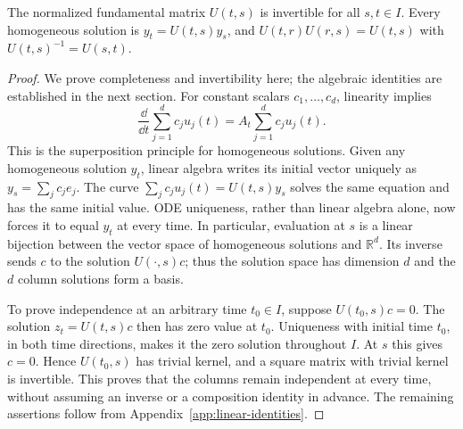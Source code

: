 \documentclass[12pt,a4paper,oneside]{book}
\begin{document}
\begin{theorem}
\label{thm:affine-flow}
The normalized fundamental matrix $U(t,s)$ is invertible for all
$s,t\in I$. Every homogeneous solution is $y_t=U(t,s)y_s$, and
$U(t,r)U(r,s)=U(t,s)$ with $U(t,s)^{-1}=U(s,t)$.
\end{theorem}
\begin{proof}
We prove completeness and invertibility here; the algebraic identities
are established in the next section.
For constant scalars $c_1,\ldots,c_d$, linearity implies
\begin{equation*}
\frac{\dd}{\dd t}\sum_{j=1}^d c_ju_j(t)
 =A_t\sum_{j=1}^d c_ju_j(t).
\end{equation*}
This is the superposition principle for homogeneous solutions.
Given any homogeneous solution $y_t$, linear algebra writes its
initial vector uniquely as $y_s=\sum_j c_je_j$. The curve
$\sum_j c_ju_j(t)=U(t,s)y_s$ solves the same equation and has
the same initial value. ODE uniqueness, rather than linear algebra
alone, now forces it to equal $y_t$ at every time.
In particular, evaluation at $s$ is a linear bijection between
the vector space of homogeneous solutions and $\mathbb R^d$.
Its inverse sends $c$ to the solution $U(\cdot,s)c$; thus the
solution space has dimension $d$ and the $d$ column solutions
form a basis.

To prove independence at an arbitrary time $t_0\in I$, suppose
$U(t_0,s)c=0$. The solution $z_t=U(t,s)c$ then has zero value
at $t_0$. Uniqueness with initial time $t_0$, in both time
directions, makes it the zero solution throughout $I$.
At $s$ this gives $c=0$. Hence $U(t_0,s)$ has trivial kernel,
and a square matrix with trivial kernel is invertible.
This proves that the columns remain independent at every time,
without assuming an inverse or a composition identity in advance.
The remaining assertions follow from Appendix~\ref{app:linear-identities}.
\end{proof}
\end{document}
